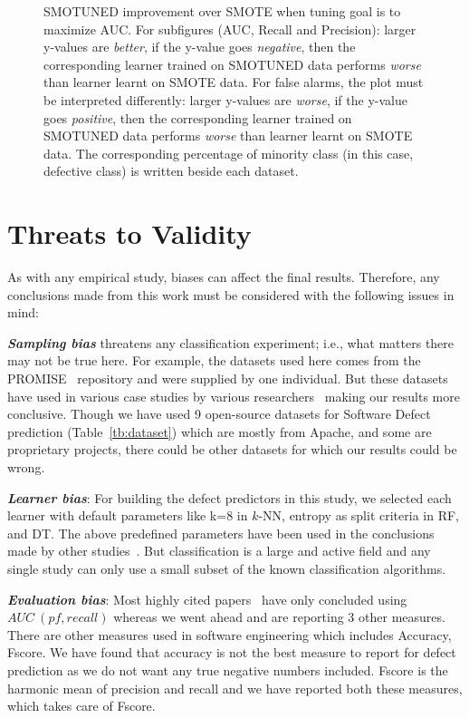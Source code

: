 \documentclass[10pt,conference]{IEEEtran}
\theoremstyle{break}
\theoremstyle{break}
\begin{document}
\begin{figure}[!htbp]
    \caption{SMOTUNED improvement over SMOTE when tuning goal is to maximize AUC. For subfigures (AUC, Recall and Precision): larger y-values are {\em better}, if the y-value goes {\em negative}, then the corresponding learner trained on SMOTUNED data performs {\em worse} than learner learnt on SMOTE data. For false alarms, the plot must be interpreted differently: larger y-values are {\em worse}, if the y-value goes {\em positive}, then the corresponding learner trained on SMOTUNED data performs {\em worse} than learner learnt on SMOTE data. The corresponding percentage of minority class (in this case, defective class) is written beside each dataset.}
    \label{fig:auc}
\vspace{-0.6cm}
\end{figure} 
\section{Threats to Validity}
\label{sect:validity}

As with any empirical study, biases can affect the final
results. Therefore, any conclusions made from this work must be considered with the following issues in mind:

\textbf{\textit{Sampling bias}} threatens any classification experiment; i.e., what matters there may not be true here. For example, the datasets used here comes from the PROMISE~\cite{promiserepo} repository and were supplied by one individual. But these datasets have used in various case studies by various researchers~\cite{he2012investigation,peters2013better,peters2013balancing,turhan2013empirical} making our results more conclusive.
Though we have used 9 open-source datasets for Software Defect prediction (Table~\ref{tb:dataset}) which are mostly from Apache, and some are proprietary projects, there could be other datasets for which our results could be wrong.

\textbf{\textit{Learner bias}}: For building the defect predictors in this
study, we selected each learner with default parameters like k=8 in $k$-NN, entropy as split criteria in RF, and DT. The above predefined parameters have been used in the conclusions made by other studies~\cite{ghotra2015revisiting,tantithamthavorn2016automated}. But classification is a large and active field and any single study can only use a small subset of the known classification algorithms.

\textbf{\textit{Evaluation bias}}: Most highly cited papers~\cite{ghotra2015revisiting,tantithamthavorn2016automated} have only concluded using $AUC\ (pf, recall)$ whereas we went ahead and are reporting 3 other measures. There are other measures used in software engineering which includes Accuracy, Fscore. We have found that accuracy is not the best measure to report for defect prediction as we do not want any true negative numbers included. Fscore is the harmonic mean of precision and recall and we have reported both these measures, which takes care of Fscore.
\end{document}
